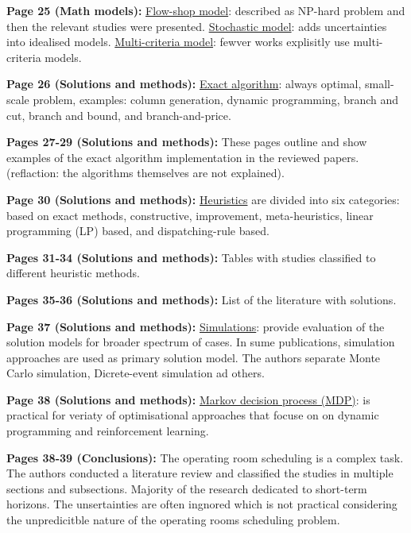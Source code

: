     \textbf{Page 25 (Math models):}
    \underline{Flow-shop model}: described as NP-hard problem and then the relevant studies were presented. \underline{Stochastic model}: adds uncertainties into idealised models. \underline{Multi-criteria model}: fewver works explisitly use multi-criteria models.
   
    \textbf{Page 26 (Solutions and methods):}
    \underline{Exact algorithm}: always optimal, small-scale problem, examples: column generation, dynamic programming, branch and cut, branch and bound, and branch-and-price.
    
    \textbf{Pages 27-29 (Solutions and methods):}
    These pages outline and show examples of the exact algorithm implementation in the reviewed papers. (reflaction: the algorithms themselves are not explained).
    
    \textbf{Page 30 (Solutions and methods):}
    \underline{Heuristics} are divided into six categories: based on exact methods, constructive, improvement, meta-heuristics, linear programming (LP) based, and dispatching-rule based. 

    \textbf{Pages 31-34 (Solutions and methods):}
    Tables with studies classified to different heuristic methods.
    
    \textbf{Pages 35-36 (Solutions and methods):}
    List of the literature with solutions.
    
    \textbf{Page 37 (Solutions and methods):}
    \underline{Simulations}: provide evaluation of the solution models for broader spectrum of cases. In sume publications, simulation approaches are used as primary solution model. The authors separate Monte Carlo simulation, Dicrete-event simulation ad others.
    
    \textbf{Page 38 (Solutions and methods):}
    \underline{Markov decision process (MDP)}: is practical for veriaty of optimisational approaches that focuse on on dynamic programming and reinforcement learning.
    
    \textbf{Pages 38-39 (Conclusions):}
    The operating room scheduling is a complex task. The authors conducted a literature review and classified the studies in multiple sections and subsections. Majority of the research dedicated to short-term horizons. The unsertainties are often ingnored which is not practical considering the unpredicitble nature of the operating rooms scheduling problem.
